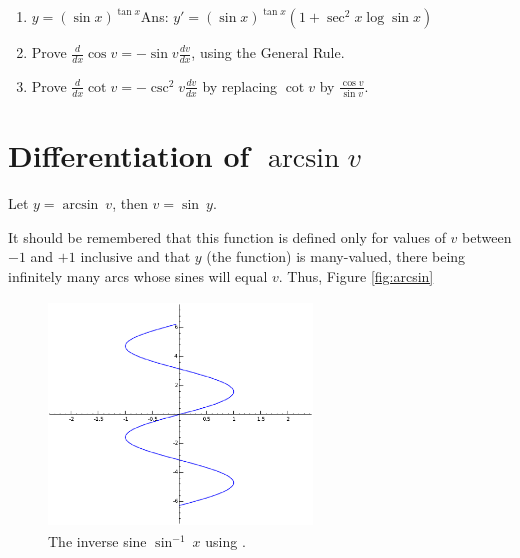 \begin{enumerate}
\item
$y = (\sin x)^{\tan x}$\qquad\qquad\qquad\qquad Ans:  	
$y' = (\sin x)^{\tan x} (1 + \sec^2 x \log \sin x)$

\item
Prove $\frac{d}{dx} \cos v = -\sin v \frac{dv}{dx}$, using the General Rule.

\item
Prove $\frac{d}{dx} \cot v = -\csc^2 v \frac{dv}{dx}$ by replacing $\cot v$ by 
$\frac{\cos v}{\sin v}$.

\end{enumerate}

\section{Differentiation of $\arcsin v$}

Let $y 	= \arcsin\ v$, then $v 	= \sin\ y$.

It should be remembered that this function is defined only for values of 
$v$ between $-1$ and $+1$ inclusive and that $y$ (the function) is many-valued,
there being infinitely many arcs whose sines will equal $v$. Thus, Figure 
\ref{fig:arcsin}

\begin{figure}[h!]
\begin{minipage}{\textwidth}
\begin{center}
\includegraphics[height=6cm,width=7cm]{arcsin2.eps}
\end{center}
\end{minipage}
\caption{The inverse sine $\sin^{-1}\ x$ using \sage.}
\label{fig:arcsin2}
\end{figure}


